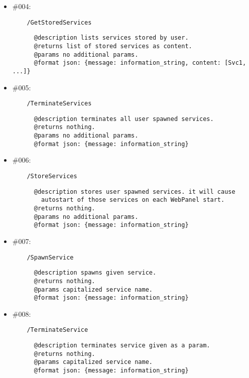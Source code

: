 \documentclass[11pt,a4paper]{scrartcl}
\begin{document}
\begin{itemize}
    \item \#004:
      \begin{verbatim}
    /GetStoredServices
      \end{verbatim}
      \begin{verbatim}
      @description lists services stored by user.
      @returns list of stored services as content.
      @params no additional params.
      @format json: {message: information_string, content: [Svc1, ...]}
      \end{verbatim}

    \item \#005:
      \begin{verbatim}
    /TerminateServices
      \end{verbatim}
      \begin{verbatim}
      @description terminates all user spawned services.
      @returns nothing.
      @params no additional params.
      @format json: {message: information_string}
      \end{verbatim}

    \item \#006:
      \begin{verbatim}
    /StoreServices
      \end{verbatim}
      \begin{verbatim}
      @description stores user spawned services. it will cause
        autostart of those services on each WebPanel start.
      @returns nothing.
      @params no additional params.
      @format json: {message: information_string}
      \end{verbatim}

    \item \#007:
      \begin{verbatim}
    /SpawnService
      \end{verbatim}
      \begin{verbatim}
      @description spawns given service.
      @returns nothing.
      @params capitalized service name.
      @format json: {message: information_string}
      \end{verbatim}

    \item \#008:
      \begin{verbatim}
    /TerminateService
      \end{verbatim}
      \begin{verbatim}
      @description terminates service given as a param.
      @returns nothing.
      @params capitalized service name.
      @format json: {message: information_string}
      \end{verbatim}


\end{itemize}
\end{document}
